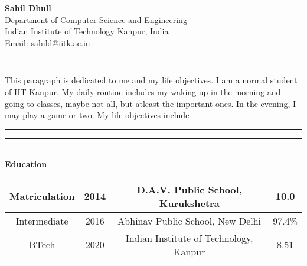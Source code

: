 \documentclass[a4paper, 11pt]{article}
\begin{document}
\noindent
\textbf{Sahil Dhull}
\\Department of Computer Science and Engineering
\\Indian Institute of Technology Kanpur, India
\\Email: sahild@iitk.ac.in
\vspace{0.4cm}
\hrule
\vspace{0.1cm}
\hrule
\vspace{0.3cm}
\noindent
This paragraph is dedicated to me and my life objectives.
I am a normal student of IIT Kanpur. My daily routine includes my waking up in the morning and going to classes, maybe not all, but atleast the important ones. In the evening, I may play a game or two.
My life objectives include \lipsum[66]
\vspace{0.1cm}
\hrule
\vspace{0.1cm}
\hrule
\vspace{0.3cm}
\noindent
\\{\bf Education}\\

\noindent
\vspace{1cm}
\begin{tabular}{|c|c|c|c|}
  \hline
  Matriculation & 2014 & D.A.V. Public School, Kurukshetra & 10.0\\
  \hline
  Intermediate & 2016 & Abhinav Public School, New Delhi & 97.4\%\\
  \hline
  BTech & 2020 & Indian Institute of Technology, Kanpur & 8.51\\
  \hline
\end{tabular}

\\
\end{document}
